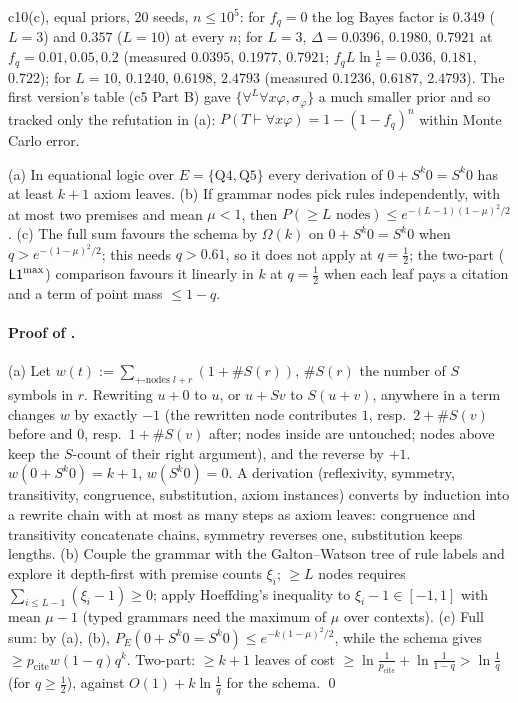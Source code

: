 c10(c), equal priors, 20 seeds, $n\le10^5$: for $f_q=0$ the log Bayes factor is $0.349$ ($L=3$) and $0.357$ ($L=10$) at every $n$; for $L=3$, $\Delta=0.0396$, $0.1980$, $0.7921$ at $f_q=0.01,0.05,0.2$ (measured $0.0395$, $0.1977$, $0.7921$; $f_qL\ln\frac1c=0.036$, $0.181$, $0.722$); for $L=10$, $0.1240$, $0.6198$, $2.4793$ (measured $0.1236$, $0.6187$, $2.4793$). The first version's table (c5 Part B) gave $\{\forall^L\forall x\varphi,\sigma_\varphi\}$ a much smaller prior and so tracked only the refutation in (a): $P(T\vdash\forall x\varphi)=1-(1-f_q)^n$ within Monte Carlo error.

\begin{proposition}\label{prop:univ:eqfrag}
\textup{(a)} In equational logic over $E=\{\text{Q4},\text{Q5}\}$ every derivation of $0+S^k0=S^k0$ has at least $k+1$ axiom leaves. \textup{(b)} If grammar nodes pick rules independently, with at most two premises and mean $\mu<1$, then $P(\ge L\text{ nodes})\le e^{-(L-1)(1-\mu)^2/2}$. \textup{(c)} The full sum favours the schema by $\Omega(k)$ on $0+S^k0=S^k0$ when $q>e^{-(1-\mu)^2/2}$; this needs $q>0.61$, so it does not apply at $q=\tfrac12$; the two-part ($\mathord{\mathsf{L1}}^{\max}$) comparison favours it linearly in $k$ at $q=\tfrac12$ when each leaf pays a citation and a term of point mass $\le1-q$.
\end{proposition}

\paragraph{Proof of .} (a) Let $w(t):=\sum_{+\text{-nodes }l+r}(1+\#S(r))$, $\#S(r)$ the number of $S$ symbols in $r$. Rewriting $u+0$ to $u$, or $u+Sv$ to $S(u+v)$, anywhere in a term changes $w$ by exactly $-1$ (the rewritten node contributes $1$, resp.\ $2+\#S(v)$ before and $0$, resp.\ $1+\#S(v)$ after; nodes inside are untouched; nodes above keep the $S$-count of their right argument), and the reverse by $+1$. $w(0+S^k0)=k+1$, $w(S^k0)=0$. A derivation (reflexivity, symmetry, transitivity, congruence, substitution, axiom instances) converts by induction into a rewrite chain with at most as many steps as axiom leaves: congruence and transitivity concatenate chains, symmetry reverses one, substitution keeps lengths. (b) Couple the grammar with the Galton--Watson tree of rule labels and explore it depth-first with premise counts $\xi_i$; $\ge L$ nodes requires $\sum_{i\le L-1}(\xi_i-1)\ge0$; apply Hoeffding's inequality \citep{hoeffding1963probability} to $\xi_i-1\in[-1,1]$ with mean $\mu-1$ (typed grammars need the maximum of $\mu$ over contexts). (c) Full sum: by (a), (b), $P_E(0+S^k0=S^k0)\le e^{-k(1-\mu)^2/2}$, while the schema gives $\ge p_{\mathrm{cite}}w(1-q)q^k$. Two-part: $\ge k+1$ leaves of cost $\ge\ln\frac1{p_{\mathrm{cite}}}+\ln\frac1{1-q}>\ln\frac1q$ (for $q\ge\tfrac12$), against $O(1)+k\ln\frac1q$ for the schema. \qed

